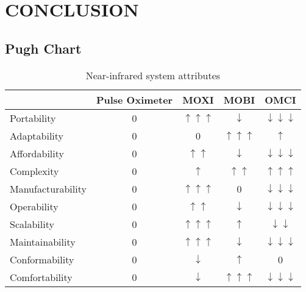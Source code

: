 \chapter{CONCLUSION} %
\label{chap:conclusion}


\section{Pugh Chart}

\begin{table}[]
\centering
\caption{Near-infrared system attributes}
\label{tab:pughtable}
\begin{tabular}{@{}lcccc@{}}
\toprule
                  & Pulse Oximeter & MOXI                      & MOBI                      & OMCI                            \\ \midrule
Portability       & 0              & $\uparrow \uparrow \uparrow$ & $\downarrow$               & $\downarrow \downarrow \downarrow$ \\
Adaptability      & 0              & 0                         & $\uparrow \uparrow \uparrow$ & $\uparrow$                       \\
Affordability     & 0              & $\uparrow \uparrow$         & $\downarrow$               & $\downarrow \downarrow \downarrow$ \\
Complexity        & 0              & $\uparrow$                 & $\uparrow \uparrow$         & $\uparrow \uparrow \uparrow$       \\
Manufacturability & 0              & $\uparrow \uparrow \uparrow$ & 0                         & $\downarrow \downarrow \downarrow$ \\
Operability       & 0              & $\uparrow \uparrow$         & $\downarrow$               & $\downarrow \downarrow \downarrow$ \\
Scalability       & 0              & $\uparrow \uparrow \uparrow$ & $\uparrow$                 & $\downarrow \downarrow$           \\
Maintainability   & 0              & $\uparrow \uparrow \uparrow$ & $\downarrow$               & $\downarrow \downarrow \downarrow$ \\
Conformability    & 0              & $\downarrow$               & $\uparrow$                 & 0                               \\
Comfortability    & 0              & $\downarrow$               & $\uparrow \uparrow \uparrow$ & $\downarrow \downarrow \downarrow$ \\ \bottomrule
\end{tabular}
\end{table}

